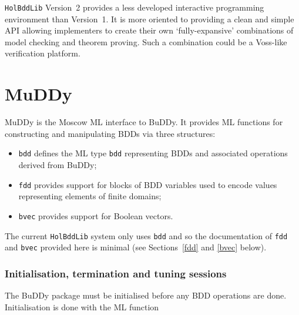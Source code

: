 \documentclass[12pt]{article}
\renewcommand{\t}[1]{\mbox{\tt #1}}
\newcommand{\Buddy}{BuDDy\xspace}
\newcommand{\Muddy}{MuDDy\xspace}
\newcommand\HolBuddy{\texttt{HolBddLib}\xspace}
\begin{document}
{\tt{HolBddLib}} Version~2 provides a less developed interactive
programming environment than Version~1. It is more oriented to
providing a clean and simple API allowing implementers to create their
own `fully-expansive' combinations of model checking and theorem
proving. Such a combination could be a Voss-like verification
platform.

\newpage


\makeatletter
\let\My@@tableofcontents\tableofcontents
\renewcommand\tableofcontents{{%
    \let\My@@addvspace\addvspace
    \def\addvspace##1{%
      \@tempskipa##1\relax
      \My@@addvspace{0.1\@tempskipa}%
    }%
    \My@@tableofcontents
}}
\makeatother

\tableofcontents


\newpage

\part{\Muddy}\label{muddy}

\Muddy is the Moscow
ML interface to \Buddy. It provides ML functions for constructing and
manipulating BDDs via three structures:

\begin{itemize}

\item \t{bdd} defines the ML type
\t{bdd} representing BDDs and associated operations derived from \Buddy;


\item \t{fdd} provides support for blocks of BDD variables
used to encode values representing elements of finite domains;

\item \t{bvec} provides support for Boolean vectors.

\end{itemize}

The current \HolBuddy{} system only uses \t{bdd} and so
the documentation of \t{fdd} and \t{bvec} provided here is minimal
(see Sections~\ref{fdd} and \ref{bvec} below).

\section{Initialisation, termination and tuning sessions}\label{init}

The \Buddy{} package must be initialised before any BDD operations are done.
Initialisation is done with the ML function
\end{document}
